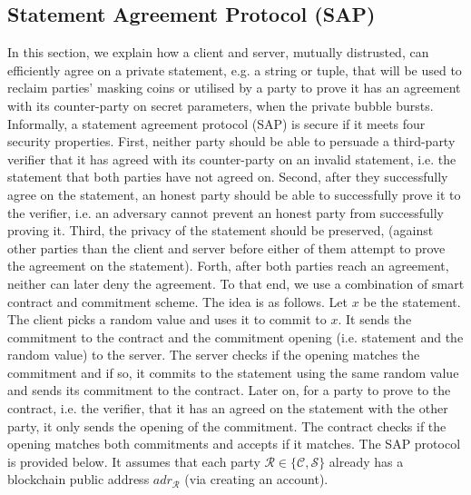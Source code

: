 
\subsection{Statement Agreement Protocol (SAP)}\label{SAP}



In this section, we explain how a client and server, mutually distrusted, can efficiently agree on a private statement, e.g.  a string or tuple, that will be used to reclaim parties' masking coins or utilised by a party to prove it has an agreement with its counter-party on  secret parameters, when the private bubble bursts. Informally, a statement agreement protocol (SAP) is secure if it meets four security properties. First, neither party should be able to persuade  a third-party  verifier that it has agreed with its counter-party on an invalid statement, i.e. the statement that both parties have not agreed on. Second, after they successfully agree on the statement,  an honest party should be able to successfully prove it to the verifier, i.e. an adversary cannot prevent an honest party from successfully proving it. Third, the privacy of the statement should be preserved, (against other parties than the client and server before either of them attempt to prove the agreement on the statement). Forth, after both parties reach an agreement, neither can later deny the agreement. To that end, we use a combination of smart contract and commitment scheme. The idea is as follows. Let $x$ be the statement. The client picks a random value and uses it to commit to $x$. It sends the commitment to the contract and the commitment opening (i.e. statement and the random value) to the server. The server checks if the opening matches the commitment and if so, it commits to the statement using the same random value and sends its commitment to the contract. Later on, for a party to prove to the contract, i.e. the verifier, that it has an agreed on the statement with the other party, it only sends the opening of the commitment.  The contract checks if the opening matches both commitments and accepts if it matches. The SAP protocol is provided below. It assumes that each party $\mathcal{R} \in\{\mathcal{C,S}\}$ already has a blockchain public address $adr_{\scriptscriptstyle\mathcal{R}}$ (via creating an account). 



